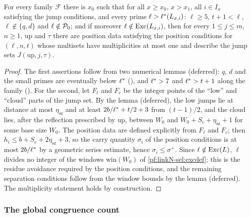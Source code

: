\begin{lemma}\label{pf:linkN-sel:posdata}
For every family $\mathcal F$ there is $x_0$ such that for all $x\ge x_0$, $x>x_1$, all $i\in I_x$ satisfying the jump conditions, and every prime
$\ell>\ell^{*}(L_{x,i})$: $\ell\ge5$, $t+1<\ell$, $\ell\notin\{q,d\}$ and $\ell\notin\mathcal P_0$; and if moreover $\ell\notin\mathrm{Exc}(L_{x,i})$,
then for every $1\le j\le m$, $n\ge1$, $\mathrm{up}$ and $\tau$ there are position data satisfying the position conditions for $(\ell,n,t)$ whose
multisets have multiplicities at most one and describe the jump sets $J(\mathrm{up},j,\tau)$.
\end{lemma}

\begin{proof}
The first assertions follow from two numerical lemmas (deferred): $q$, $d$ and the small primes are eventually below $\ell^{*}$
(), and $\ell^{*}>7$ and $\ell^{*}>t+1$ along the family
(). For the second, let $F_\ell$ and $F_c$ be the integer points of the ``low''
and ``cloud'' parts of the jump set. By the lemma  (deferred), the
low jumps lie at distance at most $\eta_{\mathrm{sz}}$ and at least $2b/\ell^{*}+t/2+3$ from $(t-1)/2$, and the cloud lies, after the reflection
prescribed by $\mathrm{up}$, between $W_0$ and $W_0+S_c+\eta_{\mathrm{sz}}+1$ for some base size $W_0$. The position data are defined explicitly
from $F_\ell$ and $F_c$; then $h_i\le b+S_c+2\eta_{\mathrm{sz}}+3$, so the carry quantity $\sigma_i$ of the position conditions is at most
$2b/\ell^{*}$ by a geometric series estimate, hence $\sigma_i\le\sigma^+$. Since $\ell\notin\mathrm{Exc}(L)$, $\ell$ divides no integer of the
windows $\mathrm{win}(W_0)$ of \cref{pf:linkN-sel:excdef}; this is the residue avoidance required by the position conditions, and the remaining
separation conditions follow from the window bounds by the lemma 
(deferred). The multiplicity statement holds by construction.
\end{proof}

\subsubsection{The global congruence count}

